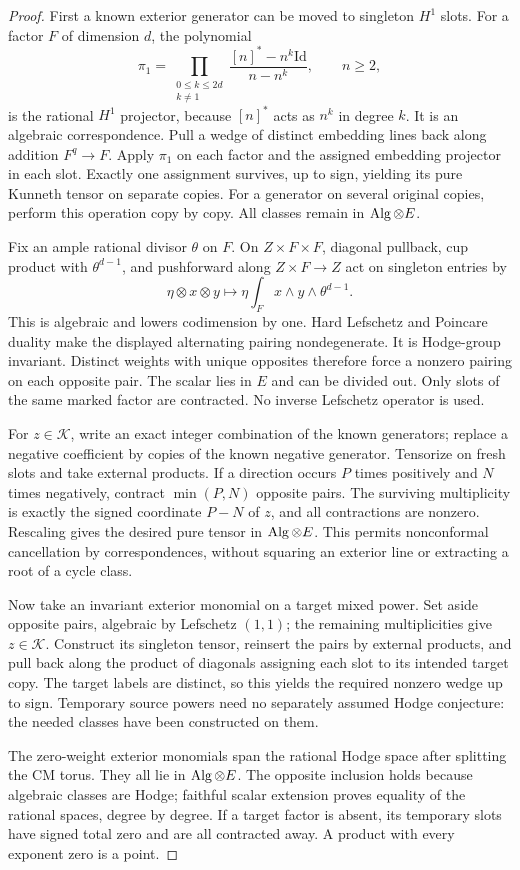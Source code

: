 \begin{proof}
First a known exterior generator can be moved to singleton $H^1$ slots.
For a factor $F$ of dimension $d$, the polynomial
\[
 \pi_1=\prod_{\substack{0\le k\le2d\\k\ne1}}
 \frac{[n]^*-n^k\mathrm{Id}}{n-n^k},\qquad n\ge2,
\]
is the rational $H^1$ projector, because $[n]^*$ acts as $n^k$ in
degree $k$. It is an algebraic correspondence. Pull a wedge of distinct
embedding lines back along addition $F^q\to F$. Apply $\pi_1$ on
each factor and the assigned embedding projector in each slot. Exactly
one assignment survives, up to sign, yielding its pure Kunneth tensor
on separate copies. For a generator on several original copies, perform
this operation copy by copy. All classes remain in $\operatorname{Alg}\otimes E$.

Fix an ample rational divisor $\theta$ on $F$. On $Z\times F\times F$,
diagonal pullback, cup product with $\theta^{d-1}$, and pushforward
along $Z\times F\to Z$ act on singleton entries by
\[
 \eta\otimes x\otimes y\longmapsto
 \eta\int_F x\wedge y\wedge\theta^{d-1}.
\]
This is algebraic and lowers codimension by one. Hard Lefschetz and
Poincare duality make the displayed alternating pairing nondegenerate.
It is Hodge-group invariant. Distinct weights with unique opposites
therefore force a nonzero pairing on each opposite pair. The scalar
lies in $E$ and can be divided out. Only slots of the same marked factor
are contracted. No inverse Lefschetz operator is used.

For $z\in\mathcal K$, write an exact integer combination of the known
generators; replace a negative coefficient by copies of the known
negative generator. Tensorize on fresh slots and take external products.
If a direction occurs $P$ times positively and $N$ times negatively,
contract $\min(P,N)$ opposite pairs. The surviving multiplicity is
exactly the signed coordinate $P-N$ of $z$, and all contractions are
nonzero. Rescaling gives the desired pure tensor in $\operatorname{Alg}\otimes E$.
This permits nonconformal cancellation by correspondences, without
squaring an exterior line or extracting a root of a cycle class.

Now take an invariant exterior monomial on a target mixed power. Set
aside opposite pairs, algebraic by Lefschetz $(1,1)$; the remaining
multiplicities give $z\in\mathcal K$. Construct its singleton tensor,
reinsert the pairs by external products, and pull back along the product
of diagonals assigning each slot to its intended target copy. The target
labels are distinct, so this yields the required nonzero wedge up to
sign. Temporary source powers need no separately assumed Hodge
conjecture: the needed classes have been constructed on them.

The zero-weight exterior monomials span the rational Hodge space after
splitting the CM torus. They all lie in $\operatorname{Alg}\otimes E$. The opposite
inclusion holds because algebraic classes are Hodge; faithful scalar
extension proves equality of the rational spaces, degree by degree.
If a target factor is absent, its temporary slots have signed total zero
and are all contracted away. A product with every exponent zero is a point.
\end{proof}

